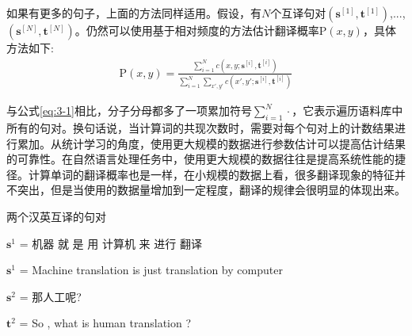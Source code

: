 \parinterval 如果有更多的句子，上面的方法同样适用。假设，有$N$个互译句对$(\mathbf{s}^{[1]},\mathbf{t}^{[1]})$,...,\\$(\mathbf{s}^{[N]},\mathbf{t}^{[N]})$。仍然可以使用基于相对频度的方法估计翻译概率$\textrm{P}(x,y)$，具体方法如下:
\begin{eqnarray}
\textrm{P}(x,y)  =  \frac{{\sum_{i=1}^{N} c(x,y;\mathbf{s}^{[i]},\mathbf{t}^{[i]})}}{\sum_{i=1}^{N}{{\sum_{x',y'} c(x',y';\mathbf{s}^{[i]},\mathbf{t}^{[i]})}}}
\label{eq:3-4}
\end{eqnarray}

\noindent 与公式\ref{eq:3-1}相比，分子分母都多了一项累加符号$\sum_{i=1}^{N} \cdot$，它表示遍历语料库中所有的句对。换句话说，当计算词的共现次数时，需要对每个句对上的计数结果进行累加。从统计学习的角度，使用更大规模的数据进行参数估计可以提高估计结果的可靠性。在自然语言处理任务中，使用更大规模的数据往往是提高系统性能的捷径。计算单词的翻译概率也是一样，在小规模的数据上看，很多翻译现象的特征并不突出，但是当使用的数据量增加到一定程度，翻译的规律会很明显的体现出来。

\begin{example}
两个汉英互译的句对

\qquad\qquad \; $\mathbf{s}^1$ = 机器\; 就\; 是\; 用\; 计算机\; 来\; 进行\; {\color{red}翻译}

\qquad\qquad\; $\mathbf{s}^1$ = Machine\; {\color{red}translation}\; is\; just\; {\color{red}translation}\; by\; computer

\qquad\qquad\; $\mathbf{s}^2$ = 那\quad 人工\quad 呢\quad ?

\qquad\qquad\; $\mathbf{t}^2$ = So\; ,\; what\; is\; human\; {\color{red}translation}\; ?
\label{eg:3-2}
\end{example}

